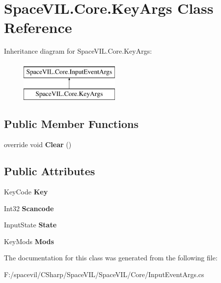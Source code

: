 \hypertarget{class_space_v_i_l_1_1_core_1_1_key_args}{}\section{Space\+V\+I\+L.\+Core.\+Key\+Args Class Reference}
\label{class_space_v_i_l_1_1_core_1_1_key_args}
Inheritance diagram for Space\+V\+I\+L.\+Core.\+Key\+Args\+:\begin{figure}[H]
\begin{center}
\leavevmode
\includegraphics[height=2.000000cm]{class_space_v_i_l_1_1_core_1_1_key_args}
\end{center}
\end{figure}
\subsection*{Public Member Functions}
\begin{DoxyCompactItemize}
\item 
\mbox{\label{class_space_v_i_l_1_1_core_1_1_key_args_a1521dd5bebbcc13ac6f1bcffe9dac487}} 
override void {\bfseries Clear} ()
\end{DoxyCompactItemize}
\subsection*{Public Attributes}
\begin{DoxyCompactItemize}
\item 
\mbox{\label{class_space_v_i_l_1_1_core_1_1_key_args_a15ddee7149bbe1aebc6449a7e7952a25}} 
Key\+Code {\bfseries Key}
\item 
\mbox{\label{class_space_v_i_l_1_1_core_1_1_key_args_af188536c7b040c27d4348e02961e955e}} 
Int32 {\bfseries Scancode}
\item 
\mbox{\label{class_space_v_i_l_1_1_core_1_1_key_args_a605a658b9d5ce2855a6a4730dc03d2ce}} 
Input\+State {\bfseries State}
\item 
\mbox{\label{class_space_v_i_l_1_1_core_1_1_key_args_a00396e83c43c0c8ffd01e9d320a983c1}} 
Key\+Mods {\bfseries Mods}
\end{DoxyCompactItemize}


The documentation for this class was generated from the following file\+:\begin{DoxyCompactItemize}
\item 
F\+:/spacevil/\+C\+Sharp/\+Space\+V\+I\+L/\+Space\+V\+I\+L/\+Core/Input\+Event\+Args.\+cs\end{DoxyCompactItemize}
